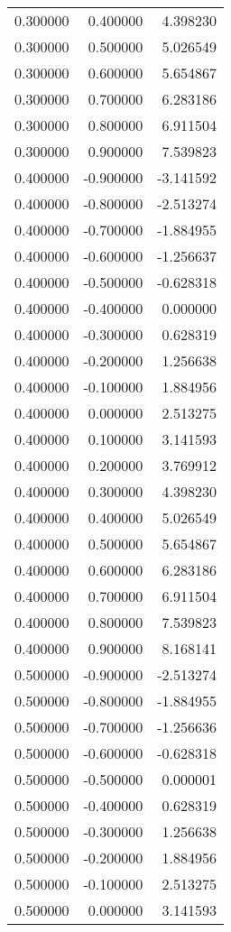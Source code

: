 \begin{tabular}{rrr}
0.300000 & 0.400000 & 4.398230 \\
0.300000 & 0.500000 & 5.026549 \\
0.300000 & 0.600000 & 5.654867 \\
0.300000 & 0.700000 & 6.283186 \\
0.300000 & 0.800000 & 6.911504 \\
0.300000 & 0.900000 & 7.539823 \\
0.400000 & -0.900000 & -3.141592 \\
0.400000 & -0.800000 & -2.513274 \\
0.400000 & -0.700000 & -1.884955 \\
0.400000 & -0.600000 & -1.256637 \\
0.400000 & -0.500000 & -0.628318 \\
0.400000 & -0.400000 & 0.000000 \\
0.400000 & -0.300000 & 0.628319 \\
0.400000 & -0.200000 & 1.256638 \\
0.400000 & -0.100000 & 1.884956 \\
0.400000 & 0.000000 & 2.513275 \\
0.400000 & 0.100000 & 3.141593 \\
0.400000 & 0.200000 & 3.769912 \\
0.400000 & 0.300000 & 4.398230 \\
0.400000 & 0.400000 & 5.026549 \\
0.400000 & 0.500000 & 5.654867 \\
0.400000 & 0.600000 & 6.283186 \\
0.400000 & 0.700000 & 6.911504 \\
0.400000 & 0.800000 & 7.539823 \\
0.400000 & 0.900000 & 8.168141 \\
0.500000 & -0.900000 & -2.513274 \\
0.500000 & -0.800000 & -1.884955 \\
0.500000 & -0.700000 & -1.256636 \\
0.500000 & -0.600000 & -0.628318 \\
0.500000 & -0.500000 & 0.000001 \\
0.500000 & -0.400000 & 0.628319 \\
0.500000 & -0.300000 & 1.256638 \\
0.500000 & -0.200000 & 1.884956 \\
0.500000 & -0.100000 & 2.513275 \\
0.500000 & 0.000000 & 3.141593 \\

\end{tabular}
